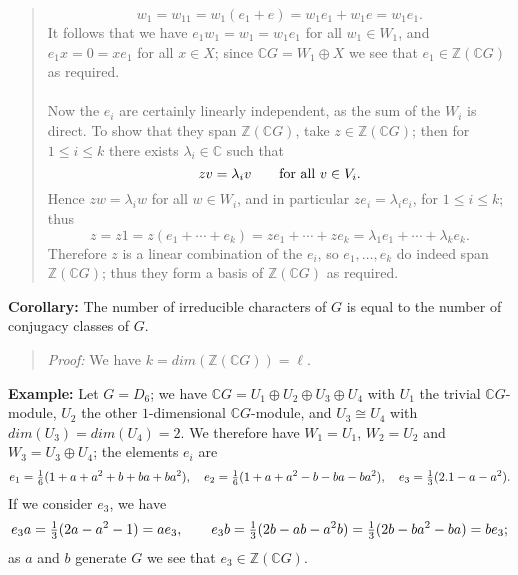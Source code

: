 {\begin{quote}
$$w_1=w_11=w_1(e_1+e)=w_1e_1+w_1e=w_1e_1.$$
It follows that we have $e_1w_1=w_1=w_1e_1$ for all $w_1\in W_1$, and
$e_1x=0=xe_1$ for all $x\in X$;
since ${\mathbb C}G=W_1\oplus X$ we see that $e_1\in {\mathbb Z}({\mathbb C}G)$ as required.
\\
\\
Now the $e_i$ are certainly linearly independent, as the sum
of the $W_i$ is direct. To show that they span ${\mathbb Z}({\mathbb C}G)$, take
$z\in {\mathbb Z}({\mathbb C}G)$; then for $1\leq i\leq k$ there
exists $\lambda_i\in{\mathbb C}$ such that
$$zv=\lambda_iv\qquad\hbox{for all }v\in V_i.$$
Hence $zw=\lambda_iw$ for all $w\in W_i$, and in particular
$ze_i=\lambda_ie_i$, for $1\leq i\leq k$; thus
$$z=z1=z(e_1+\cdots+e_k)=ze_1+\cdots+ze_k=\lambda_1e_1+\cdots+\lambda_ke_k.$$
Therefore $z$ is a linear combination of the $e_i$, so $e_1,\dots,e_k$ do
indeed span ${\mathbb {\mathbb {\mathbb {\mathbb Z}}}}({\mathbb C}G)$; 
thus they form a basis of ${\mathbb Z}({\mathbb C}G)$ as required.
\end{quote}
{\bf Corollary:} The number of irreducible characters of $G$ is
equal to the number of conjugacy classes of $G$.
\begin{quote}
\emph{Proof:}
We have $k= dim({\mathbb Z}({\mathbb C}G))= \ell$.
\end{quote}
{\bf Example:} Let $G=D_6$; we have
${\mathbb C}G=U_1\oplus U_2\oplus U_3\oplus U_4$ with $U_1$ the trivial ${\mathbb C}G$-module,
$U_2$ the other $1$-dimensional ${\mathbb C}G$-module, and $U_3\cong U_4$ with
$dim (U_3)= dim(U_4) = 2$. We therefore have $W_1=U_1$, $W_2=U_2$ and
$W_3=U_3\oplus U_4$; the elements $e_i$ are
$$e_1={\textstyle\frac{1}{6}}(1+a+a^2+b+ba+ba^2),\quad
e_2={\textstyle\frac{1}{6}}(1+a+a^2-b-ba-ba^2),\quad
e_3={\textstyle\frac{1}{3}}(2.1-a-a^2).$$
If we consider $e_3$, we have
$$e_3a={\textstyle\frac{1}{3}}(2a-a^2-1)=ae_3,\qquad
e_3b={\textstyle\frac{1}{3}}(2b-ab-a^2b)={\textstyle\frac{1}{3}}(2b-ba^2-ba)=be_3;$$
as $a$ and $b$ generate $G$ we see that $e_3\in {\mathbb Z}({\mathbb C}G)$.
}
